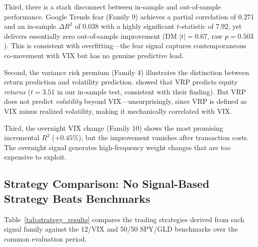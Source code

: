 \documentclass[12pt,a4paper]{article}
\begin{document}
Third, there is a stark disconnect between in-sample and out-of-sample performance. Google Trends fear (Family 9) achieves a partial correlation of 0.271 and an in-sample $\Delta R^2$ of 0.038 with a highly significant $t$-statistic of 7.92, yet delivers essentially zero out-of-sample improvement (DM $|t| = 0.67$, raw $p = 0.503$). This is consistent with overfitting---the fear signal captures contemporaneous co-movement with VIX but has no genuine predictive lead.

Second, the variance risk premium (Family 4) illustrates the distinction between return prediction and volatility prediction. \citet{bollerslev2009} showed that VRP predicts equity \emph{returns} ($t = 3.51$ in our in-sample test, consistent with their finding). But VRP does not predict \emph{volatility} beyond VIX---unsurprisingly, since VRP is defined as VIX minus realized volatility, making it mechanically correlated with VIX.

Third, the overnight VIX change (Family 10) shows the most promising incremental $R^2$ ($+0.45\%$), but the improvement vanishes after transaction costs. The overnight signal generates high-frequency weight changes that are too expensive to exploit.

\subsection{Strategy Comparison: No Signal-Based Strategy Beats Benchmarks}

Table~\ref{tab:strategy_results} compares the trading strategies derived from each signal family against the 12/VIX and 50/50 SPY/GLD benchmarks over the common evaluation period.
\end{document}
